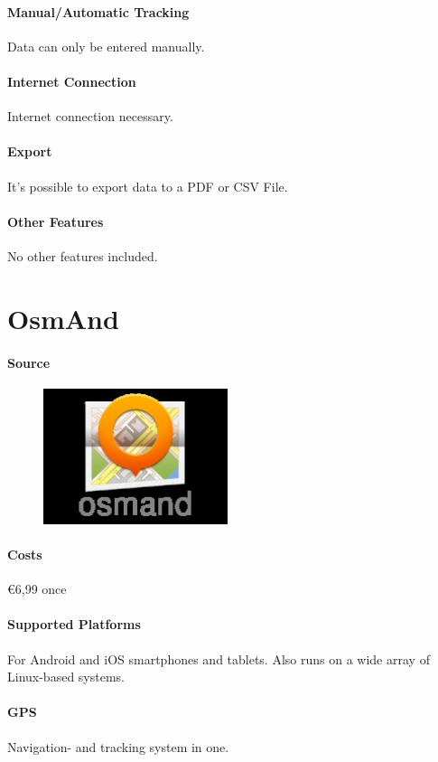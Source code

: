\paragraph{Manual/Automatic Tracking} Data can only be entered manually.
\paragraph{Internet Connection} Internet connection necessary.
\paragraph{Export} It’s possible to export data to a PDF or CSV File.
\paragraph{Other Features} No other features included.
\newpage

\section{OsmAnd} 
\paragraph{Source}
\begin{figure}
  \begin{center}
    \includegraphics[width=0.48\textwidth]{osmand}
  \end{center}
\end{figure} 
\paragraph{Costs} \euro 6,99 once
\paragraph{Supported Platforms} For Android and iOS smartphones and tablets. Also runs on a wide array of Linux-based systems.
\paragraph{GPS} Navigation- and tracking  system in one.
